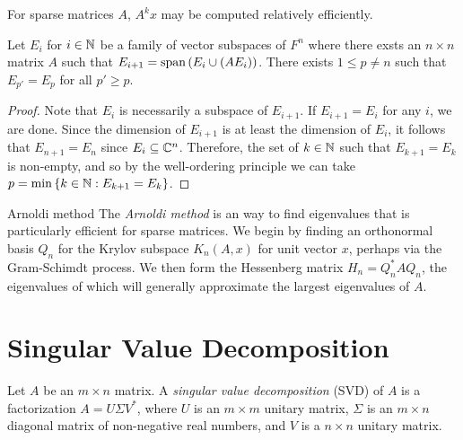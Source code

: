 \begin{rmk}
    For sparse matrices $A$, $A^{k}x$ may be computed relatively efficiently.
\end{rmk}

\begin{lemma}
    Let $E_i$ for $i \in \mathbb{N}$ be a family of vector subspaces of $F^n$ where there exsts an $n \times n$ matrix $A$ such that $E_{i+1} = \operatorname{span}\left(E_i \cup \left(AE_i\right)\right)$. There exists $1 \leq p \neq n$ such that $E_{p'} = E_p$ for all $p' \geq p$.
\end{lemma}

\begin{proof}
    Note that $E_i$ is necessarily a subspace of $E_{i+1}$. If $E_{i+1} = E_i$ for any $i$, we are done. Since the dimension of $E_{i+1}$ is at least the dimension of $E_i$, it follows that $E_{n+1} = E_n$ since $E_i \subseteq \mathbb{C}^n$. Therefore, the set of $k \in \mathbb{N}$ such that $E_{k+1} = E_k$ is non-empty, and so by the well-ordering principle we can take $p = \min\left\{k \in \mathbb{N} : E_{k+1} = E_k\right\}$.
\end{proof}

\begin{defn}{Arnoldi method}\proofbreak
    The \emph{Arnoldi method} is an way to find eigenvalues that is particularly efficient for sparse matrices. We begin by finding an orthonormal basis $Q_n$ for the Krylov subspace $K_n(A, x)$ for unit vector $x$, perhaps via the Gram-Schimdt process. We then form the Hessenberg matrix $H_n = Q_n^{*}AQ_n$, the eigenvalues of which will generally approximate the largest eigenvalues of $A$.
\end{defn}

\section{Singular Value Decomposition}

\begin{defn}
    Let $A$ be an $m \times n$ matrix. A \emph{singular value decomposition} (SVD) of $A$ is a factorization $A = U\Sigma V^{*}$, where $U$ is an $m \times m$ unitary matrix, $\Sigma$ is an $m \times n$ diagonal matrix of non-negative real numbers, and $V$ is a $n \times n$ unitary matrix.
\end{defn}

